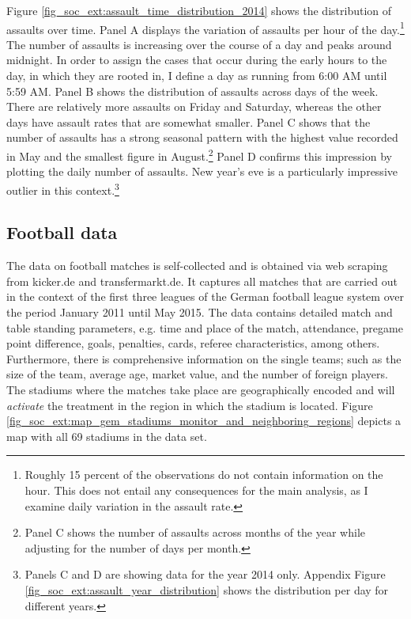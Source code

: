 Figure \ref{fig_soc_ext:assault_time_distribution_2014} shows the distribution of assaults over time. Panel A displays the variation of assaults per hour of the day.\footnote{Roughly 15 percent of the observations do not contain information on the hour. This does not entail any consequences for the main analysis, as I examine daily variation in the assault rate.} The number of assaults is increasing over the course of a day and peaks around midnight. In order to assign the cases that occur during the early hours to the day, in which they are rooted in, I define a day as running from 6:00 AM until 5:59 AM. Panel B shows the distribution of assaults across days of the week. There are relatively more assaults on Friday and Saturday, whereas the other days have assault rates that are somewhat smaller. Panel C shows that the number of assaults has a strong seasonal pattern with the highest value recorded in May and the smallest figure in August.\footnote{Panel C shows the number of assaults across months of the year while adjusting for the number of days per month.} Panel D confirms this impression by plotting the daily number of assaults. New year's eve is a particularly impressive outlier in this context.\footnote{Panels C and D are showing data for the year 2014 only. Appendix Figure \ref{fig_soc_ext:assault_year_distribution} shows the distribution per day for different years.}






\subsection{Football data}
The data on football matches is self-collected and is obtained via web scraping from kicker.de and transfermarkt.de. It captures all matches that are carried out in the context of the first three leagues of the German football league system over the period January 2011 until May 2015. The data contains detailed match and table standing parameters, e.g. time and place of the match, attendance, pregame point difference, goals, penalties, cards, referee characteristics, among others. Furthermore, there is comprehensive information on the single teams; such as the size of the team, average age, market value, and the number of foreign players. The stadiums where the matches take place are geographically encoded and will \textit{activate} the treatment in the region in which the stadium is located. Figure \ref{fig_soc_ext:map_gem_stadiums_monitor_and_neighboring_regions} depicts a map with all 69 stadiums in the data set. 

